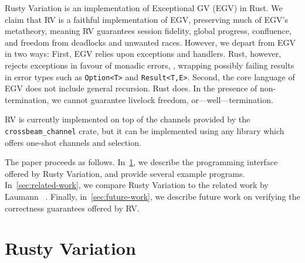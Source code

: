 \documentclass[copyright,creativecommons]{eptcs}
\begin{document}
Rusty Variation is an implementation of Exceptional GV (EGV) in Rust. We claim that RV is a faithful implementation of EGV, preserving much of EGV's metatheory, meaning RV guarantees session fidelity, global progress, confluence, and freedom from deadlocks and unwanted races. However, we depart from EGV in two ways:
First, EGV relies upon exceptions and handlers. Rust, however, rejects exceptions in favour of monadic errors, \ie, wrapping possibly failing results in error types such as \lstinline{Option<T>} and \lstinline{Result<T,E>}.
Second, the core language of EGV does not include general recursion. Rust does. In the presence of non-termination, we cannot guarantee livelock freedom, or---well---termination.

RV is currently implemented on top of the channels provided by the \lstinline{crossbeam_channel} crate, but it can be implemented using any library which offers one-shot channels and selection.

The paper proceeds as follows. In~\cref{sec:contribution}, we describe the programming interface offered by Rusty Variation, and provide several example programs. In~\cref{sec:related-work}, we compare Rusty Variation to the related work by Laumann \etal~\cite{jespersen2015}. Finally, in~\cref{sec:future-work}, we describe future work on verifying the correctness guarantees offered by RV.

\section{Rusty Variation}\label{sec:contribution}
\end{document}
